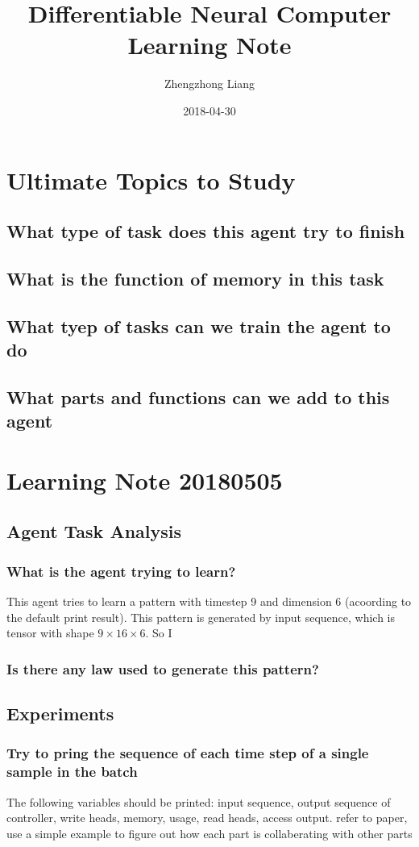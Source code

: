 \documentclass{article}
\title{Differentiable Neural Computer Learning Note}
\author{Zhengzhong Liang}
\date{2018-04-30}
\begin{document}
\maketitle
\section{Ultimate Topics to Study}
\subsection{What type of task does this agent try to finish}
\subsection{What is the function of memory in this task}
\subsection{What tyep of tasks can we train the agent to do}
\subsection{What parts and functions can we add to this agent}

\section{Learning Note 20180505}
\subsection{Agent Task Analysis}
\subsubsection{What is the agent trying to learn?}
This agent tries to learn a pattern with timestep 9 and dimension 6 (acoording to the default print result). This pattern is generated by input sequence, which is tensor with shape $9\times16\times6$. So I
\subsubsection{Is there any law used to generate this pattern?} 


\subsection{Experiments}
\subsubsection{Try to pring the sequence of each time step of a single sample in the batch}
The following variables should be printed: input sequence, output sequence of controller, write heads, memory, usage, read heads, access output. {\color{red}refer to paper, use a simple example to figure out how each part is collaberating with other parts}
\end{document}
